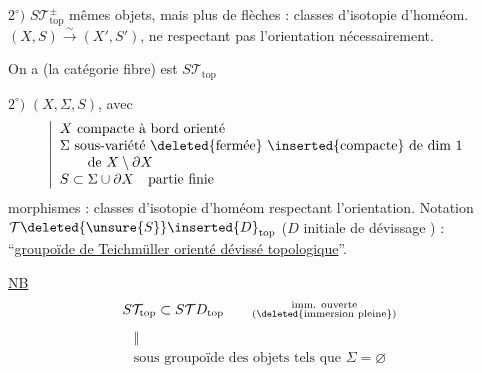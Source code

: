 $2^\circ)$ $\boxed{S\mathcal T_{\mathrm{top}}^\pm}$ mêmes objets, mais plus de flèches :
classes d'isotopie d'homéom. $(X,S)\xrightarrow{\sim}(X',S')$, ne respectant pas l'orientation nécessairement.

On a
   (la catégorie fibre) est $S\mathcal T_{\mathrm{top}}$

$2^\circ)$ $(X,\Sigma,S)$, avec
\[
\left|\begin{array}{l}
X\ \text{compacte à bord orienté}\\
\Sigma\ \text{sous-variété \deleted{fermée} \inserted{compacte} de dim $1$}\\
\qquad\text{de }X\setminus\partial X\\
S\subset\Sigma\cup\partial X\quad\text{partie finie}
\end{array}\right.
\]
morphismes : classes d'isotopie d'homéom respectant l'orientation.
Notation $\mathcal T\deleted{\unsure{S}}\inserted{D}_{\mathrm{top}}$
($D$ initiale de dévissage ) :
``\uline{groupoïde de Teichmüller orienté dévissé topologique}''.

\uline{NB}
\[
S\mathcal T_{\mathrm{top}}\subset S\mathcal TD_{\mathrm{top}}
\qquad
\substack{\text{imm. ouverte}\\(\deleted{\text{immersion pleine}})}
\]
\[
\substack{\Vert\\\text{sous groupoïde des objets tels que }\Sigma=\varnothing}
\]

